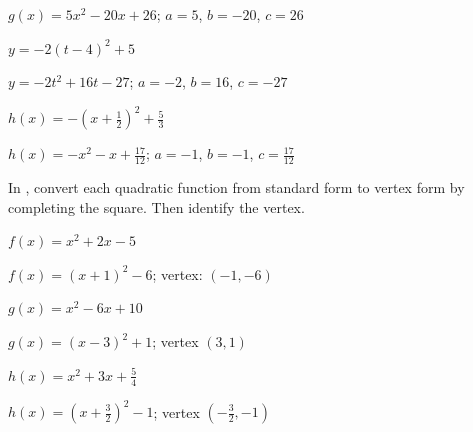 \begin{solution}
    $g(x)=5x^2-20x+26$; $a=5$, $b=-20$, $c=26$
\end{solution}



\begin{exercise}
$y=-2(t-4)^2+5$
\end{exercise}

\begin{solution}
    $y=-2t^2+16t-27$; $a=-2$, $b=16$, $c=-27$
\end{solution}



\begin{exercise}\label{exercise-3.3.8}
$h(x)=-(x+\frac{1}{2})^2+\frac{5}{3}$
\end{exercise}

\begin{solution}
    $h(x)=-x^2-x+\frac{17}{12}$; $a=-1$, $b=-1$, $c=\frac{17}{12}$
\end{solution}








\noindent In , convert each quadratic function from standard form to vertex form by completing the square. Then identify the vertex.


\begin{exercise}\label{exercise-3.3.9}
$f(x)=x^2+2 x-5$
\end{exercise}

\begin{solution}
    $f(x)=(x+1)^2-6$; vertex: $(-1,-6)$
\end{solution}



\begin{exercise}
$g(x)=x^2-6 x+10$
\end{exercise}

\begin{solution}
     $g(x)=\left(x-3\right)^2+1$; vertex $(3,1)$
\end{solution}



\begin{exercise}
$h(x)=x^2+3x+\frac{5}{4}$
\end{exercise}

\begin{solution}
    $h(x)=\left(x+\frac{3}{2}\right)^2-1$; vertex $\left(-\frac{3}{2},-1\right)$
\end{solution}



